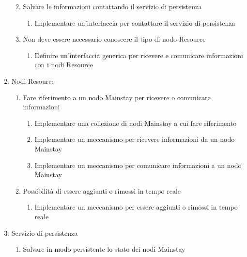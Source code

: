 \begin{enumerate}
\begin{enumerate}
\begin{enumerate}
                    \end{enumerate}
              \item Salvare le informazioni contattando il servizio di persistenza
                    \begin{enumerate}
                        \item Implementare un'interfaccia per contattare il servizio di persistenza
                    \end{enumerate}
              \item Non deve essere necessario conoscere il tipo di nodo Resource
                    \begin{enumerate}
                        \item Definire un'interfaccia generica per ricevere e comunicare informazioni con i nodi Resource
                    \end{enumerate}
          \end{enumerate}
    \item Nodi Resource
          \begin{enumerate}
              \item Fare riferimento a un nodo Mainstay per ricevere o comunicare informazioni
                    \begin{enumerate}
                        \item Implementare una collezione di nodi Mainstay a cui fare riferimento
                        \item Implementare un meccanismo per ricevere informazioni da un nodo Mainstay
                        \item Implementare un meccanismo per comunicare informazioni a un nodo Mainstay
                    \end{enumerate}
              \item Possibilità di essere aggiunti o rimossi in tempo reale
                    \begin{enumerate}
                        \item Implementare un meccanismo per essere aggiunti o rimossi in tempo reale
                    \end{enumerate}
          \end{enumerate}
    \item Servizio di persistenza
          \begin{enumerate}
              \item Salvare in modo persistente lo stato dei nodi Mainstay
                    \begin{enumerate}

\end{enumerate}
\end{enumerate}
\end{enumerate}
